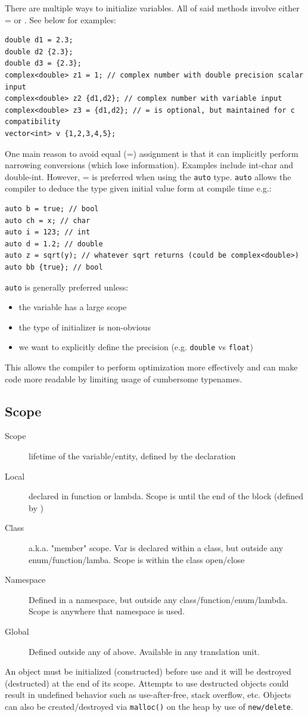 \documentclass[a4paper, 10pt]{article}
\begin{document}
There are multiple ways to initialize variables. All of said methods involve either = or {}. See below for examples:
\begin{lstlisting}[style=cpp]
double d1 = 2.3;
double d2 {2.3};
double d3 = {2.3};
complex<double> z1 = 1; // complex number with double precision scalar input
complex<double> z2 {d1,d2}; // complex number with variable input
complex<double> z3 = {d1,d2}; // = is optional, but maintained for c compatibility
vector<int> v {1,2,3,4,5};
\end{lstlisting}
One main reason to avoid equal (=) assignment is that it can implicitly perform narrowing conversions (which lose information). Examples include int-char and double-int. However, = is preferred when using the \verb!auto! type. \verb!auto! allows the compiler to deduce the type given initial value form at compile time e.g.:
\begin{lstlisting}[style=cpp]
auto b = true; // bool
auto ch = x; // char
auto i = 123; // int
auto d = 1.2; // double
auto z = sqrt(y); // whatever sqrt returns (could be complex<double>)
auto bb {true}; // bool
\end{lstlisting}
\verb!auto! is generally preferred unless:
\begin{itemize}
	\item the variable has a large scope
	\item the type of initializer is non-obvious
	\item we want to explicitly define the precision (e.g. \verb!double! vs \verb!float!)
\end{itemize}
This allows the compiler to perform optimization more effectively and can make code more readable by limiting usage of cumbersome typenames.
\subsection{Scope}
\begin{description}
	\item[Scope]
	      lifetime of the variable/entity, defined by the declaration
	\item[Local]
	      declared in function or lambda. Scope is until the end of the block (defined by {})
	\item[Class]
	      a.k.a. "member" scope. Var is declared within a class, but outside any enum/function/lamba. Scope is within the class open/close {}
	\item[Namespace]
	      Defined in a namespace, but outside any class/function/enum/lambda. Scope is anywhere that namespace is used.
	\item[Global]
	      Defined outside any of above. Available in any translation unit.
\end{description}
An object must be initialized (constructed) before use and it will be destroyed (destructed) at the end of its scope. Attempts to use destructed objects could result in undefined behavior such as use-after-free, stack overflow, etc.
Objects can also be created/destroyed via \verb!malloc()! on the heap by use of \verb!new/delete!.
\end{document}
